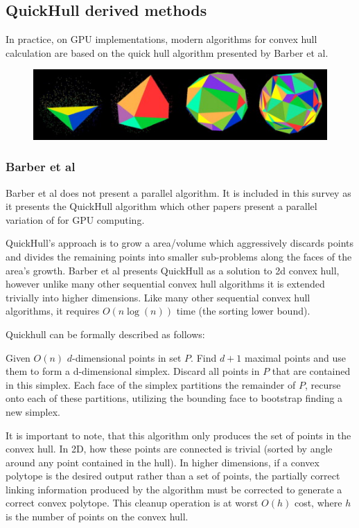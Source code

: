\documentclass[10pt,a4paper]{report}
\begin{document}
\subsection{QuickHull derived methods}

In practice, on GPU implementations, modern algorithms for convex hull calculation are based on the quick hull algorithm presented by Barber et al.

\begin{figure}[h!]
        \centering
\includegraphics[width=\textwidth]{imgs/CUDAhull_example.jpg}

\end{figure}

\subsubsection{Barber et al}
Barber et al\cite{Barber1996} does not present a parallel algorithm. It is included in this survey as it presents the QuickHull algorithm which other papers present a parallel variation of for GPU computing.

QuickHull's approach is to grow a area/volume which aggressively discards points and divides the remaining points into smaller sub-problems along the faces of the area's growth.
Barber et al presents QuickHull as a solution to 2d convex hull, however unlike many other sequential convex hull algorithms it is extended trivially into higher dimensions.
Like many other sequential convex hull algorithms, it requires $O(n\log(n))$ time (the sorting lower bound).

Quickhull can be formally described as follows:

Given $O(n)$ $d$-dimensional points in set $P$. 
Find $d+1$ maximal points and use them to form a d-dimensional simplex.
Discard all points in $P$ that are contained in this simplex.
Each face of the simplex partitions the remainder of $P$, recurse onto each of these partitions, utilizing the bounding face to bootstrap finding a new simplex.

It is important to note, that this algorithm only produces the set of points in the convex hull. In 2D, how these points are connected is trivial (sorted by angle around any point contained in the hull).
In higher dimensions, if a convex polytope is the desired output rather than a set of points, the partially correct linking information produced by the algorithm must be corrected to generate a correct convex polytope.
This cleanup operation is at worst $O(h)$ cost, where $h$ is the number of points on the convex hull.
\end{document}
